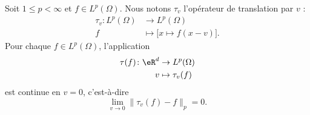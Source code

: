\begin{lemma}   \label{LemCUlJzkA}
	Soit \( 1\leq p<\infty\) et \( f\in L^p(\Omega)\). Nous notons \( \tau_v\) l'opérateur de translation par \( v\) :
	\begin{equation}
		\begin{aligned}
			\tau_v\colon L^p(\Omega) & \to L^p(\Omega)                      \\
			f                        & \mapsto \Big[ x\mapsto f(x-v) \Big].
		\end{aligned}
	\end{equation}
	Pour chaque \( f\in L^p(\Omega)\), l'application
	\begin{equation}
		\begin{aligned}
			\tau(f)\colon \eR^d & \to L^p(\Omega)   \\
			v                   & \mapsto \tau_v(f)
		\end{aligned}
	\end{equation}
	est continue en \( v=0\), c'est-à-dire
	\begin{equation}
		\lim_{v\to 0}\| \tau_v(f)-f \|_p=0.
	\end{equation}
\end{lemma}

